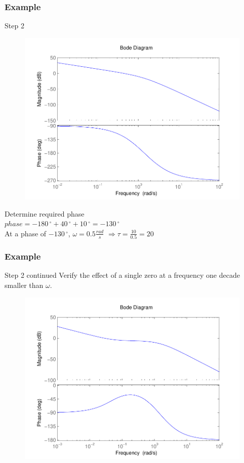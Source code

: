 \begin{frame}
\frametitle{Example}
\begin{block}{Step 2}
\begin{figure}
	\centering
	\includegraphics[width=0.5
	\linewidth]{bodeexamplelag}
\end{figure}
Determine required phase \\ $phase = -180\,^{\circ} + 40\,^{\circ} + 10\,^{\circ} = -130\,^{\circ}$ \\ At a phase of $-130\,^{\circ}$, $\omega = 0.5 \frac{rad}{s}$ $\Rightarrow \tau = \frac{10}{0.5} = 20$
\end{block}
\end{frame}

\begin{frame}
\frametitle{Example}
\begin{block}{Step 2 continued}
Verify the effect of a single zero at a frequency one decade smaller than $\omega$.
\begin{figure}
	\centering
	\includegraphics[width=0.5
	\linewidth]{bodeexamplelagstep2continued}
\end{figure}
\end{block}
\end{frame}

